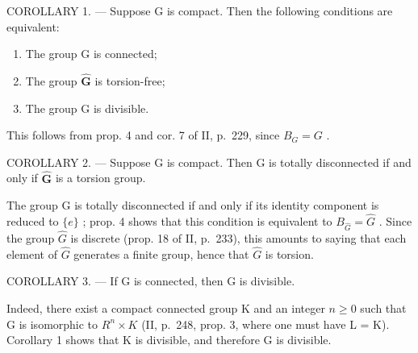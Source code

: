 COROLLARY 1. --- Suppose G is compact. Then the following conditions are equivalent:

\begin{enumerate}
\def\labelenumi{(\roman{enumi})}
\item
  The group G is connected;
\item
  The group \(\widehat{\mathbf{G}}\) is torsion-free;
\item
  The group G is divisible.
\end{enumerate}

This follows from prop. 4 and cor. 7 of II, p.~229, since \(B_{G} = G\) .

COROLLARY 2. --- Suppose G is compact. Then G is totally disconnected if and only if \(\widehat{\mathbf{G}}\) is a torsion group.

The group G is totally disconnected if and only if its identity component is reduced to \(\{e\}\) ; prop. 4 shows that this condition is equivalent to \(B_{\widehat{G}} = \widehat{G}\) . Since the group \(\widehat{G}\) is discrete (prop. 18 of II, p.~233), this amounts to saying that each element of \(\widehat{G}\) generates a finite group, hence that \(\widehat{G}\) is torsion.

COROLLARY 3. --- If G is connected, then G is divisible.

Indeed, there exist a compact connected group K and an integer \(n \geqslant 0\) such that G is isomorphic to \(R^{n} \times K\) (II, p.~248, prop. 3, where one must have L = K). Corollary 1 shows that K is divisible, and therefore G is divisible.


